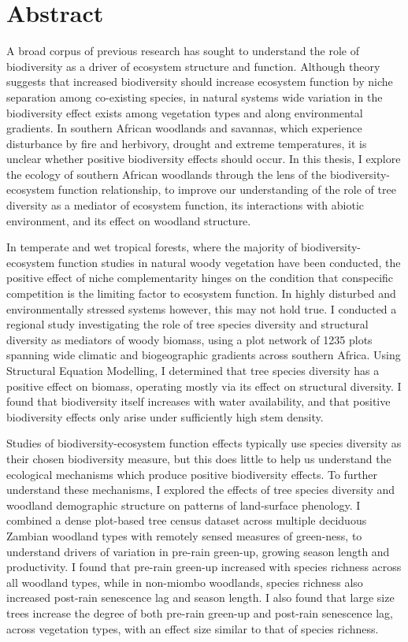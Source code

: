\chapter*{Abstract}

\label{abstract}

A broad corpus of previous research has sought to understand the role of biodiversity as a driver of ecosystem structure and function. Although theory suggests that increased biodiversity should increase ecosystem function by niche separation among co-existing species, in natural systems wide variation in the biodiversity effect exists among vegetation types and along environmental gradients. In southern African woodlands and savannas, which experience disturbance by fire and herbivory, drought and extreme temperatures, it is unclear whether positive biodiversity effects should occur. In this thesis, I explore the ecology of southern African woodlands through the lens of the biodiversity-ecosystem function relationship, to improve our understanding of the role of tree diversity as a mediator of ecosystem function, its interactions with abiotic environment, and its effect on woodland structure. 

In temperate and wet tropical forests, where the majority of biodiversity-ecosystem function studies in natural woody vegetation have been conducted, the positive effect of niche complementarity hinges on the condition that conspecific competition is the limiting factor to ecosystem function. In highly disturbed and environmentally stressed systems however, this may not hold true. I conducted a regional study investigating the role of tree species diversity and structural diversity as mediators of woody biomass, using a plot network of 1235 plots spanning wide climatic and biogeographic gradients across southern Africa. Using Structural Equation Modelling, I determined that tree species diversity has a positive effect on biomass, operating mostly via its effect on structural diversity. I found that biodiversity itself increases with water availability, and that positive biodiversity effects only arise under sufficiently high stem density.

Studies of biodiversity-ecosystem function effects typically use species diversity as their chosen biodiversity measure, but this does little to help us understand the ecological mechanisms which produce positive biodiversity effects. To further understand these mechanisms, I explored the effects of tree species diversity and woodland demographic structure on patterns of land-surface phenology. I combined a dense plot-based tree census dataset across multiple deciduous Zambian woodland types with remotely sensed measures of green-ness, to understand drivers of variation in pre-rain green-up, growing season length and productivity. I found that pre-rain green-up increased with species richness across all woodland types, while in non-miombo woodlands, species richness also increased post-rain senescence lag and season length. I also found that large size trees increase the degree of both pre-rain green-up and post-rain senescence lag, across vegetation types, with an effect size similar to that of species richness.

